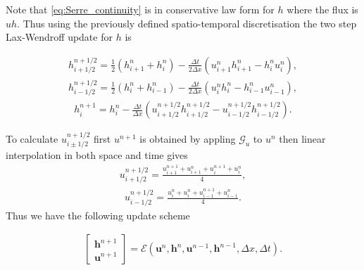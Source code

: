 \documentclass[SingleSpace,12pt,Journal]{Serre_ASCE}
\begin{document}
Note that \eqref{eq:Serre_continuity} is in conservative law form for $h$ where the flux is $uh$. Thus using the previously defined spatio-temporal discretisation the two step Lax-Wendroff update for $h$ is
\begin{linenomath*}
\begin{gather}
h^{n + 1/2}_{i+ 1/2} = \frac{1}{2}\left(h^{n}_{i+1} + h^{n}_i\right) - \frac{\Delta t}{2\Delta x}\left(u^n_{i+1}h^n_{i+1} - h^n_{i}u^n_{i}\right),
\end{gather}
\begin{gather}
h^{n + 1/2}_{i- 1/2} = \frac{1}{2}\left(h^{n}_{i} + h^{n}_{i-1}\right) - \frac{\Delta t}{2\Delta x}\left(u^n_{i}h^n_{i} - h^n_{i-1}u^n_{i-1}\right),
\end{gather}
\begin{gather}
h^{n+1}_i = h^{n}_i - \frac{\Delta t}{\Delta x}\left(u^{n + 1/2}_{i+ 1/2}h^{n + 1/2}_{i+ 1/2} - u^{n + 1/2}_{i- 1/2}h^{n + 1/2}_{i- 1/2}\right).
\label{eq:LW4h}
\end{gather}
\end{linenomath*}
To calculate $u^{n + 1/2}_{i \pm 1/2}$ first $u^{n+1}$ is obtained by appling $\mathcal{G}_u$ to $u^n$ then linear interpolation in both space and time gives
\begin{gather}
u^{n + 1/2}_{i+ 1/2} = \frac{u^{n+1}_{i+1} + u^{n}_{i+1} + u^{n+1}_{i} + u^{n}_{i} }{4},
\end{gather}
\begin{gather}
u^{n + 1/2}_{i- 1/2} = \frac{u^{n}_{i} + u^{n}_{i} + u^{n+1}_{i-1}+ u^{n}_{i-1} }{4}.
\end{gather}
Thus we have the following update scheme
\begin{linenomath*}
\begin{gather}
\left[ \begin{array}{l}
\boldsymbol{h}^{n+1} \\
\boldsymbol{u}^{n+1}
 \end{array}\right] = \mathcal{E}\left(\boldsymbol{u}^n,\boldsymbol{h}^n, \boldsymbol{u}^{n-1},\boldsymbol{h}^{n-1}, \Delta x, \Delta t \right). 
\end{gather}
\end{linenomath*}

\end{document}
